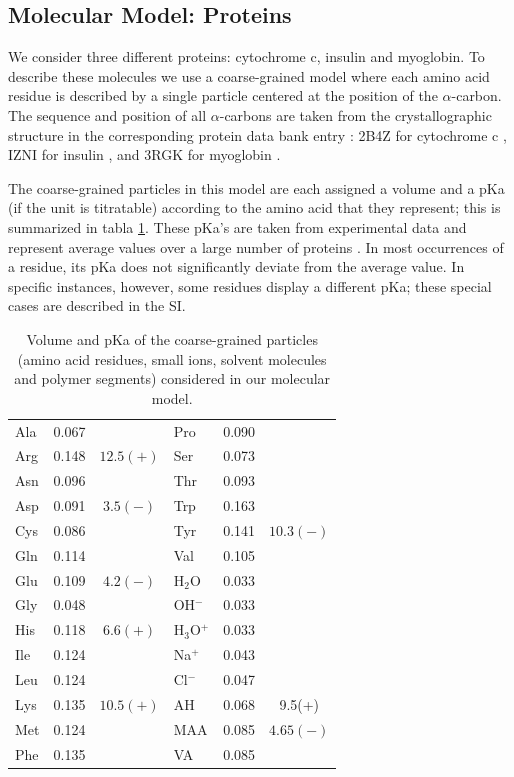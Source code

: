 \subsection{Molecular Model: Proteins}\label{sect:protein}


We consider three different proteins:  cytochrome c, insulin and myoglobin.
To describe these molecules we use a coarse-grained model where each amino acid residue is described by a single particle centered at the position of the $\alpha$-carbon.
The sequence and position of all $\alpha$-carbons are taken from the crystallographic structure in the corresponding protein data bank entry : 2B4Z for cytochrome c , IZNI for insulin , and 3RGK for myoglobin \addcite[hubbard1990x]. 
 
 

The coarse-grained particles in this model are each assigned a volume and a pKa (if the unit is titratable) according to the amino acid that they represent; 
this is summarized in  tabla \ref{table:Coarse-grain}.
These pKa's are taken from experimental data and represent average values over a large number of proteins .
In most occurrences of a residue, its pKa does not significantly deviate from the average value.
In  specific instances, however, some residues display a different pKa;
these special cases are described in the SI.


\begin{table}
\centering
\small
\begin{tabular}{|lcc|lcc|}
\hline
Ala & 0.067 &  & Pro & 0.090 & \\
Arg & 0.148 & $12.5 (+)$& Ser & 0.073 &\\
Asn & 0.096 &  & Thr & 0.093 & \\
Asp & 0.091 & $3.5 (-)$ & Trp & 0.163 &\\
Cys & 0.086 &  & Tyr & 0.141 & $10.3 (-)$\\
Gln & 0.114 & & Val & 0.105 &\\  
Glu & 0.109 & $4.2 (-)$ & H$_2$O & 0.033 & \\ 
Gly & 0.048 &  & OH$^-$ & 0.033 & \\
His & 0.118 & $6.6 (+)$& H$_3$O$^+$ & 0.033 &  \\ 
Ile & 0.124 &  & Na$^+$ & 0.043 & \\ %
Leu & 0.124 &  & Cl$^-$ & 0.047 & \\
Lys & 0.135 & $10.5 (+)$ & AH & 0.068 &  9.5(+)\\
Met & 0.124 & & MAA & 0.085 & $4.65(-)$\\
Phe & 0.135 &   & VA & 0.085 & \\
\hline
\end{tabular}
\caption{Volume and pKa of the coarse-grained particles (amino acid residues, small ions, solvent molecules and polymer segments)  considered in our molecular model.}
\label{table:Coarse-grain} 
\end{table}


